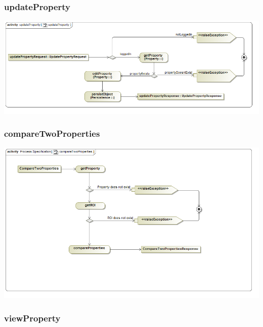 \documentclass[a4paper,12pt]{article}
\begin{document}
\subsubsection{updateProperty}
\includegraphics[width=1\textwidth]{./Images/processSpecification/updateProperty.png}
\subsubsection{compareTwoProperties}
\includegraphics[width=1\textwidth]{./Images/processSpecification/compareTwoProperties.png}
\subsubsection{viewProperty}

\end{document}

